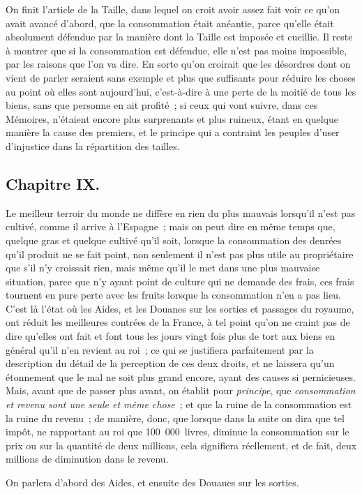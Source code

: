 \documentclass[french,twoside]{book} %
\begin{document}
On finit l’article de la Taille, dans lequel on croit avoir assez fait voir ce qu’on avait avancé d’abord, que la consommation était anéantie, parce qu’elle était absolument défendue par la manière dont la Taille est imposée et cueillie. Il reste à montrer que si la consommation est défendue, elle n’est pas moins impossible, par les raisons que l’on va dire. En sorte qu’on croirait que les désordres dont on vient de parler seraient sans exemple et plus que suffisants pour réduire les choses au point où elles sont aujourd’hui, c’est-à-dire à une perte de la moitié de tous les biens, sans que personne en ait profité ; si ceux qui vont suivre, dans ces Mémoires, n’étaient encore plus surprenants et plus ruineux, étant en quelque manière la cause des premiers, et le principe qui a contraint les peuples d’user d’injustice dans la répartition des tailles.
\subsection[{Chapitre IX.}]{Chapitre IX.}
\noindent Le meilleur terroir du monde ne diffère en rien du plus mauvais lorsqu’il n’est pas cultivé, comme il arrive à l’Espagne ; mais on peut dire en même temps que, quelque gras et quelque cultivé qu’il soit, lorsque la consommation des denrées qu’il produit ne se fait point, non seulement il n’est pas plus utile au propriétaire que s’il n’y croissait rien, mais même qu’il le met dans une plus mauvaise situation, parce que n’y ayant point de culture qui ne demande des frais, ces frais tournent en pure perte avec les fruits lorsque la consommation n’en a pas lieu. C’est là l’état où les Aides, et les Douanes sur les sorties et passages du royaume, ont réduit les meilleures contrées de la France, à tel point qu’on ne craint pas de dire qu’elles ont fait et font tous les jours vingt fois plus de tort aux biens en général qu’il n’en revient au roi ; ce qui se justifiera parfaitement par la description du détail de la perception de ces deux droits, et ne laissera qu’un étonnement que le mal ne soit plus grand encore, ayant des causes si pernicieuses. Mais, avant que de passer plus avant, on établit pour {\itshape principe}, que {\itshape consommation et revenu sont une seule et même chose} ; et que la ruine de la consommation est la ruine du revenu ; de manière, donc, que lorsque dans la suite on dira que tel impôt, ne rapportant au roi que 100 000 livres, diminue la consommation sur le prix ou sur la quantité de deux millions, cela signifiera réellement, et de fait, deux millions de diminution dans le revenu.\par
On parlera d’abord des Aides, et ensuite des Douanes sur les sorties.
\end{document}
